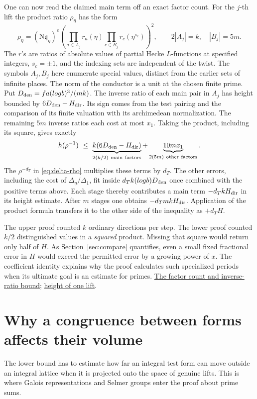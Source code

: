 \documentclass[11pt,letterpaper]{article}
\newcommand{\sref}[2]{\href{https://github.com/VladimirReshetnikov/ProveIt/blob/d8415e76ad850651f8c0083afe689dd9f4a45a10/Analysis/GeneralizedRiemannHypothesis/vendor/grh-lean/grh/src/#1.lean}{#2}}
\begin{document}
One can now read the claimed main term off an exact factor count. For the \(j\)-th lift the product ratio \(\rho_\eta\) has the form
\[
 \rho_\eta=(\mathrm{N}\mathfrak q_\eta)^e
  \left(\prod_{a\in A_j} r_a(\eta)
          \prod_{c\in B_j} r_c(\eta^{s_c})\right)^2 ,
       \qquad 2|A_j|=k,\quad |B_j|=5m .
\]
The \(r\)'s are ratios of absolute values of partial Hecke \(L\)-functions at specified integers, \(s_c=\pm1\), and the indexing sets are independent of the twist. The symbols \(A_j,B_j\) here enumerate special values, distinct from the earlier sets of infinite places. The norm of the conductor is a unit at the chosen finite prime. Put \(D_{\rm den}=fa(\log b)^3/(mk)\). The inverse ratio of each main pair in \(A_j\) has height bounded by \(6D_{\rm den}-H_{\rm dir}\). Its sign comes from the test pairing and the comparison of its finite valuation with its archimedean normalization. The remaining \(5m\) inverse ratios each cost at most \(x_1\). Taking the product, including its square, gives exactly
\[
       h(\rho^{-1})\ \le\
         \underbrace{k(6D_{\rm den}-H_{\rm dir})}_{2(k/2)\ \mathrm{main\ factors}}
            +\underbrace{10mx_1}_{2(5m)\ \mathrm{other\ factors}} .
\]
The \(\rho^{-d_T}\) in \eqref{eq:delta-rho} multiplies these terms by \(d_T\). The other errors, including the cost of \(\Delta_\eta/\Delta_1\), fit inside \(d_T k(\log b)D_{\rm den}\) once combined with the positive terms above. Each stage thereby contributes a main term \(-d_T kH_{\rm dir}\) in its height estimate. After \(m\) stages one obtains \(-d_TmkH_{\rm dir}\). Application of the product formula transfers it to the other side of the inequality as \(+d_T H\).

The upper proof counted \(k\) ordinary directions per step. The lower proof counted \(k/2\) distinguished values in a \emph{squared} product. Missing that square would return only half of \(H\). As Section~\ref{sec:compare} quantifies, even a small fixed fractional error in \(H\) would exceed the permitted error by a growing power of \(x\). The coefficient identity explains why the proof calculates such specialized periods when its ultimate goal is an estimate for primes. \sref{New/OneLift/HeckeValues/TwistedValueHeights}{The factor count and inverse-ratio bound}; \sref{New/OneLift/LiftVolumeHeight}{height of one lift}.


\section{Why a congruence between forms affects their volume}\label{sec:galoisbridge}
The lower bound has to estimate how far an integral test form can move outside an integral lattice when it is projected onto the space of genuine lifts. This is where Galois representations and Selmer groups enter the proof about prime sums.
\end{document}
